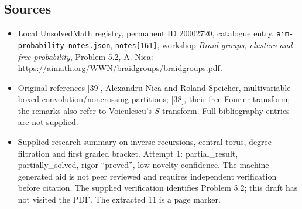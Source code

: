 \documentclass[11pt]{article}
\begin{document}
\subsection{Sources}
\begin{itemize}
\item Local UnsolvedMath registry, permanent ID \(20002720\), catalogue entry, \texttt{aim-probability-notes.json}, \texttt{notes[161]}, workshop \emph{Braid groups, clusters and free probability}, Problem 5.2, A. Nica: \url{https://aimath.org/WWN/braidgroups/braidgroups.pdf}.
\item Original references [39], Alexandru Nica and Roland Speicher, multivariable boxed convolution/noncrossing partitions; [38], their free Fourier transform; the remarks also refer to Voiculescu's \(S\)-transform. Full bibliography entries are not supplied.
\item Supplied research summary on inverse recursions, central torus, degree filtration and first graded bracket. Attempt 1: partial\_result, partially\_solved, rigor ``proved'', low novelty confidence. The machine-generated aid is not peer reviewed and requires independent verification before citation. The supplied verification identifies Problem 5.2; this draft has not visited the PDF. The extracted 11 is a page marker.
\end{itemize}
\end{document}
